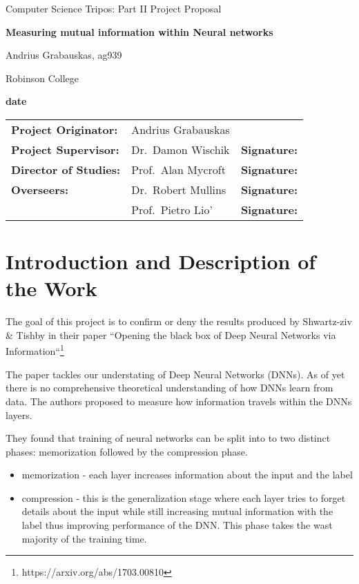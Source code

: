 \documentclass[12pt]{article}
\begin{document}
\thispagestyle{empty}

\centerline{\large Computer Science Tripos: Part II Project Proposal}
\vspace{0.4in}
\centerline{\Large\bf Measuring mutual information within Neural networks}
\vspace{0.3in}

\centerline{Andrius Grabauskas, ag939}
\centerline{Robinson College}

\centerline{\large \textbf{date}}

\vspace{1in}

\begin{tabular}{ p{4cm} p{4.5cm} l }
{\bf Project Originator:} & Andrius Grabauskas & \\[3mm]
{\bf Project Supervisor:} & Dr.\ Damon Wischik & {\bf Signature:} \\[3mm]
{\bf Director of Studies:} & Prof.\ Alan Mycroft & {\bf Signature:} \\[3mm]
{\bf Overseers:} & Dr.\ Robert Mullins & {\bf Signature:} \\[3mm]
                 & Prof.\ Pietro Lio' & {\bf Signature:} \\[3mm]
\end{tabular}

\vspace{0.75in}

\section*{Introduction and Description of the Work}

The goal of this project is to confirm or deny the results produced by
Shwartz-ziv \& Tishby in their paper ``Opening the black box of Deep Neural
Networks via Information``\footnote{https://arxiv.org/abs/1703.00810}

The paper tackles our understating of Deep Neural Networks (DNNs). As of yet
there is no comprehensive theoretical understanding of how DNNs learn from data.
The authors proposed to measure how information travels within the DNNs layers.

They found that training of neural networks can be split into to two distinct
phases: memorization followed by the compression phase.
\begin{itemize}
  \item memorization - each layer increases information about the input and the
    label
  \item compression  - this is the generalization stage where each layer tries
    to forget details about the input while still increasing mutual information
    with the label thus improving performance of the DNN. This phase takes the
    wast majority of the training time.
\end{itemize}
\end{document}
